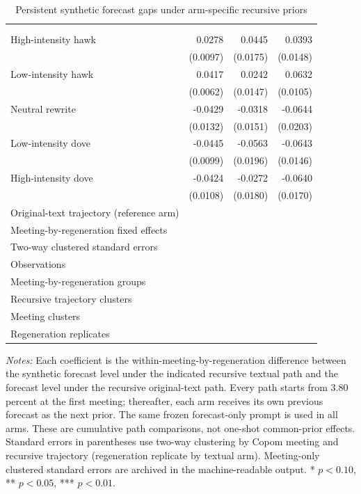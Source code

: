 \begin{table}[htbp]
\color{revisionred}
\centering
\begin{threeparttable}
\caption{Persistent synthetic forecast gaps under arm-specific recursive priors}
\label{tab:arm-specific-prior-dose-arms}
\begin{footnotesize}
\begin{tabular}{lddd}
\toprule
 &  &  &  \\
 &  &  &  \\
\midrule
High-intensity hawk & 0.0278\sym{***} & 0.0445\sym{**} & 0.0393\sym{**} \\
 & (0.0097) & (0.0175) & (0.0148) \\
Low-intensity hawk & 0.0417\sym{***} & 0.0242 & 0.0632\sym{***} \\
 & (0.0062) & (0.0147) & (0.0105) \\
Neutral rewrite & -0.0429\sym{***} & -0.0318\sym{**} & -0.0644\sym{***} \\
 & (0.0132) & (0.0151) & (0.0203) \\
Low-intensity dove & -0.0445\sym{***} & -0.0563\sym{***} & -0.0643\sym{***} \\
 & (0.0099) & (0.0196) & (0.0146) \\
High-intensity dove & -0.0424\sym{***} & -0.0272 & -0.0640\sym{***} \\
 & (0.0108) & (0.0180) & (0.0170) \\
\midrule
Original-text trajectory (reference arm) &  &  &  \\
Meeting-by-regeneration fixed effects &  &  &  \\
Two-way clustered standard errors &  &  &  \\
Observations &  &  &  \\
Meeting-by-regeneration groups &  &  &  \\
Recursive trajectory clusters &  &  &  \\
Meeting clusters &  &  &  \\
Regeneration replicates &  &  &  \\
\bottomrule
\end{tabular}
\begin{tablenotes}[flushleft]
\scriptsize
\item \textit{Notes:} Each coefficient is the within-meeting-by-regeneration difference between the synthetic forecast level under the indicated recursive textual path and the forecast level under the recursive original-text path. Every path starts from 3.80 percent at the first meeting; thereafter, each arm receives its own previous forecast as the next prior. The same frozen forecast-only prompt is used in all arms. These are cumulative path comparisons, not one-shot common-prior effects. Standard errors in parentheses use two-way clustering by Copom meeting and recursive trajectory (regeneration replicate by textual arm). Meeting-only clustered standard errors are archived in the machine-readable output. * $p<0.10$, ** $p<0.05$, *** $p<0.01$.

\end{tablenotes}
\end{footnotesize}
\end{threeparttable}
\end{table}

